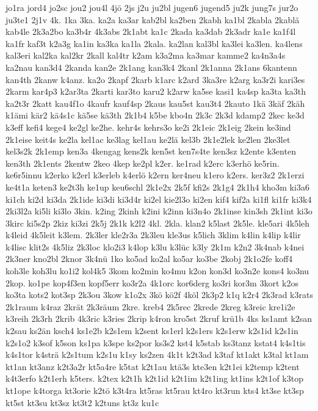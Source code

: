 {jo1ra
jord4
jo2sc
jou2
jou4l
4jö
2js
j2u
ju2bl
jugen6
jugend5
ju2k
jung7s
jur2o
ju3te1
2j1v
4k.
1ka
3ka.
ka2a
ka3ar
kab2bl
ka2ben
2kabh
ka1bl
2kabla
2kablä
kab4le
2k3a2bo
ka3b4r
4k3abs
2k1abt
ka1c
2kada
ka3dab
2k3adr
ka1e
ka1f4l
ka1fr
kaf3t
k2a3g
ka1in
ka3ka
ka1la
2kala.
ka2lan
kal3bl
ka3lei
ka3len.
ka4lens
kal3eri
kal2ka
kal2kr
2kall
kal4tr
k2am
k3a2ma
ka3mar
kamme2
ka4n3a4s
ka2nau
kan3d4
2kanda
kan2e
2k1ang
kan3k4
2kanl
2k1anna
2k1ans
6kantenn
kan4th
2kanw
k4anz.
ka2o
2kapf
2karb
k1arc
k2ard
3ka3re
k2arg
ka3r2i
kari3es
2karm
kar4p3
k2ar3ta
2karti
kar3to
karu2
k2arw
ka5se
kasi1
ka4sp
ka3ta
ka3th
ka2t3r
2katt
kau4f1o
4kaufr
kauf4sp
2kaus
kau5st
kau3t4
2kauto
1kä
3käf
2käh
k1ämi
kär2
kä4s1c
kä5se
kä3th
2k1b4
k5be
kbo4n
2k3c
2k3d
kdamp2
2kec
ke3d
k3eff
kefi4
kege4
ke2gl
ke2he.
kehr4s
kehrs3o
ke2i
2k1eic
2k1eig
2kein
ke3ind
2k1eise
keit4s
ke2la
kel1ac
ke3lag
kel1au
ke2lä
kel3b
2k1e2lek
ke2len
2ke3let
kel3s2k
2k1emp
ken3a
4kengag
kens2k
ken5st
ken7s4te
ken3sz
k2ente
k3enten
ken3th
2k1ents
2kentw
2keo
4kep
ke2pl
k2er.
ke1rad
k2erc
k3erhö
ke5rin.
ke6r5innu
k2erko
k2erl
k3erleb
k4erlö
k2ern
ker4neu
k1ero
k2ers.
ker3z2
2k1erzi
ke4t1a
keten3
ke2t3h
ke1up
keu6schl
2k1e2x
2k5f
kfi2s
2k1g4
2k1h4
kho3m
ki3a6
ki1ch
ki2d
ki3da
2k1ide
ki3di
ki3d4r
ki2el
kie2l3o
ki2en
kif4
kif2a
ki1fl
ki1fr
ki3k4
2ki3l2a
ki5li
ki3lo
3kin.
k2ing
2kinh
k2ini
k2inn
ki3n4o
2k1inse
kin3sh
2k1int
ki3o
3kirc
ki5s2p
2kiz
ki3zi
2k5j
2k1k
k2l2
4kl.
2kla.
klan2
k5last
2k5le.
kle5ari
4k5leh
k4leid
4k5leit
k3lem.
2k3ler
kle2r3a
2k3leu
kle3us
k5lich
3klim
k4lin
k4lip
k4lir
k4lisc
klit2s
4k5liz
2k3loc
klo2i3
k4lop
k3lu
k3lüc
k3ly
2k1m
k2n2
3k4nab
k4nei
2k3ner
kno2bl
2knor
3k4nü
1ko
ko5ad
ko2al
ko5ar
ko3be
2kobj
2k1o2fe
koff4
koh3le
koh3lu
ko1i2
kol4k5
3kom
ko2min
ko4mu
k2on
kon3d
ko3n2e
kons4
ko3nu
2kop.
ko1pe
kop4f3en
kopf5err
ko3r2a
4k1orc
kor6derg
ko3ri
kor3m
3kort
k2os
ko3ta
kots2
kot3sp
2k3ou
3kow
k1o2x
3kö
kö2f
4köl
2k3p2
k1q
k2r4
2k3rad
k3rats
2k1raum
k4raz
2krät
2k3räum
2kre.
kreb4
2k5rec
2krede
2kreg
k3reic
kre1i2e
k3reih
2k3rh
2krib
4k3ric
k3ries
2krip
k4ron
kro5st
2kruf
krü1b
4ks
ks1amt
k2san
k2sau
ks2än
ksch4
ks1e2b
k2s1em
k2sent
ks1erl
k2s1ers
k2s1erw
k2s1id
k2s1in
k2s1o2
k3sof
k5son
ks1pa
k3spe
ks2por
ks3s2
kst4
k5stab
ks3tanz
kstat4
k4s1tis
k4s1tor
k4strä
k2s1tum
k2s1u
k1sy
ks2zen
4k1t
k2t3ad
k3taf
kt1akt
k3tal
kt1am
kt1an
kt3anz
k2t3a2r
kt5a4re
k5tat
k2t1au
ktä3s
kte3en
k2t1ei
k2temp
k2tent
k4t3erfo
k2t1erh
k5ters.
k2tex
k2t1h
k2t1id
k2t1im
k2t1ing
kt1ins
k2t1of
k3top
kt1ope
k4torga
kt3orie
k2tö
k3t4ra
kt5ras
kt5rau
kt4ro
kt3run
kts4
kt3se
kt3sp
kt5st
kt3su
kt3sz
kt3t2
k2tuns
kt3z
ku1c
}
